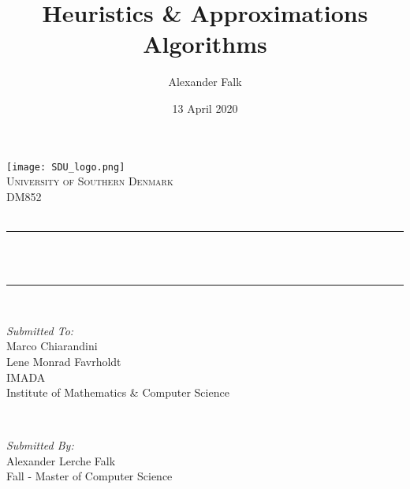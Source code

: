 \documentclass[12pt]{article}
\title{Heuristics \& Approximations Algorithms}								%
\author{Alexander Falk}								%
\date{13 April 2020}											%
\makeatletter
\let\thetitle\@title
\let\thedate\@date
\makeatother
\begin{document}

\begin{titlepage}
	\centering
    \vspace*{0.5 cm}
    \texttt{[image: SDU\_logo.png]}\\[1.0 cm]	%
    \textsc{\LARGE University of Southern Denmark}\\[2.0 cm]	%
	\textsc{\Large DM852}\\[0.5 cm]				%
	\textsc{\Large \thedate}\\[0.5 cm]				%
	\rule{\linewidth}{0.2 mm} \\[0.4 cm]
	{ \huge \bfseries \thetitle}\\
	\rule{\linewidth}{0.2 mm} \\[1.5 cm]
	
	\begin{minipage}{0.4\textwidth}
		\begin{flushleft} \large
			\emph{Submitted To:}\\
			Marco Chiarandini\\
            Lene Monrad Favrholdt \\
			IMADA \\
			Institute of Mathematics \& Computer Science\\
			\end{flushleft}
			\end{minipage}~
			\begin{minipage}{0.4\textwidth}
            
			\begin{flushright} \large
			\emph{Submitted By:} \\
			Alexander Lerche Falk\\
            Fall - Master of Computer Science\\
		\end{flushright}
        
	\end{minipage}\\[2 cm]
	
	
    
    
    
    
	
\end{titlepage}


\tableofcontents
\pagebreak
\end{document}
